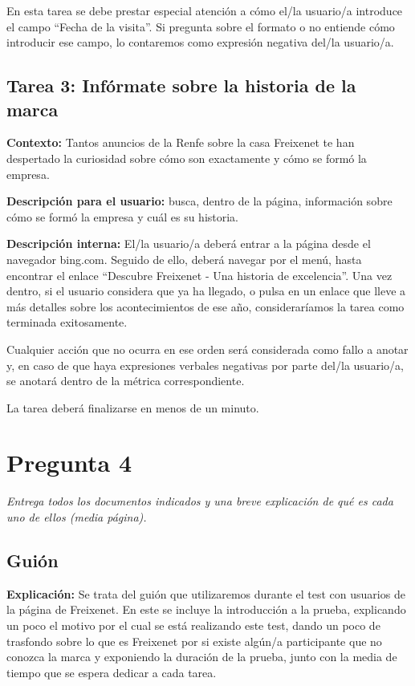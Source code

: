 \documentclass[spanish]{article}
\begin{document}
En esta tarea se debe prestar especial atención a cómo el/la
usuario/a introduce el campo ``Fecha de la visita''. Si
pregunta sobre el formato o no entiende cómo introducir ese
campo, lo contaremos como expresión negativa del/la
usuario/a.

\subsection{Tarea 3: Infórmate sobre la historia de la marca}

\textbf{Contexto: } Tantos anuncios de la Renfe sobre la
casa Freixenet te han despertado la curiosidad sobre cómo
son exactamente y cómo se formó la empresa.\newline

\textbf{Descripción para el usuario:} busca, dentro de la
página, información sobre cómo se formó la empresa y cuál es
su historia.\newline

\textbf{Descripción interna:} El/la usuario/a deberá entrar
a la página desde el navegador bing.com. Seguido de ello,
deberá navegar por el menú, hasta encontrar el enlace
``Descubre Freixenet - Una historia de excelencia''. Una vez
dentro, si el usuario considera que ya ha llegado, o pulsa
en un enlace que lleve a más detalles sobre los
acontecimientos de ese año, consideraríamos la tarea como
terminada exitosamente.\newline

Cualquier acción que no ocurra en ese orden será considerada
como fallo a anotar y, en caso de que haya expresiones
verbales negativas por parte del/la usuario/a, se anotará
dentro de la métrica correspondiente.\newline

La tarea deberá finalizarse en menos de un minuto.

\newpage

\section{Pregunta 4}

\textit{Entrega todos los documentos indicados y una breve
explicación de qué es cada uno de ellos (media página).}

\subsection{Guión}

\textbf{Explicación:} Se trata del guión que utilizaremos
durante el 
test con usuarios de la página de Freixenet. En este se
incluye la introducción a la prueba, explicando un poco el
motivo por el cual se está realizando este test, dando un
poco de trasfondo sobre lo que es Freixenet por si existe
algún/a participante que no conozca la marca y exponiendo la
duración de la prueba, junto con la media de tiempo que se
espera dedicar a cada tarea.\newline
\end{document}
